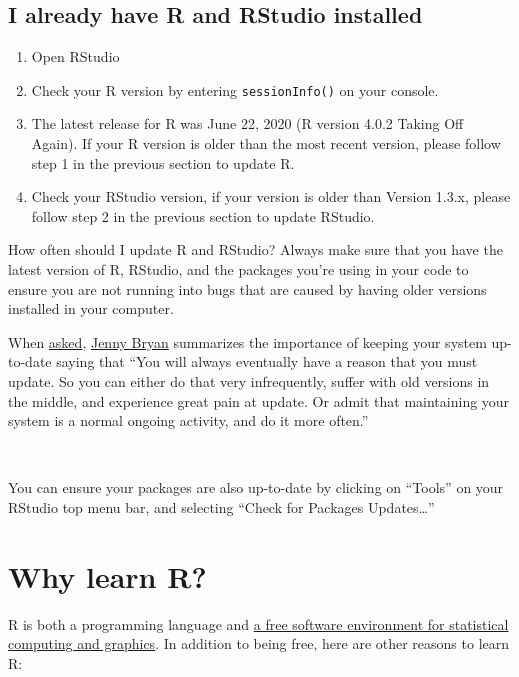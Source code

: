 \documentclass[
]{book}
\providecommand{\tightlist}{%
  \setlength{\itemsep}{0pt}\setlength{\parskip}{0pt}}
\begin{document}
\hypertarget{i-already-have-r-and-rstudio-installed}{%
\subsection{I already have R and RStudio installed}\label{i-already-have-r-and-rstudio-installed}}

\begin{enumerate}
\def\labelenumi{\arabic{enumi}.}
\tightlist
\item
  Open RStudio
\item
  Check your R version by entering \texttt{sessionInfo()} on your console.
\item
  The latest release for R was June 22, 2020 (R version 4.0.2 Taking Off Again). If your R version is older than the most recent version, please follow step 1 in the previous section to update R.
\item
  Check your RStudio version, if your version is older than Version 1.3.x, please follow step 2 in the previous section to update RStudio.
\end{enumerate}

How often should I update R and RStudio? Always make sure that you have the latest version of R, RStudio, and the packages you're using in your code to ensure you are not running into bugs that are caused by having older versions installed in your computer.

When \href{https://community.rstudio.com/t/should-i-update-all-my-r-packages-frequently-yes-no-why/5856/4}{asked}, \href{https://community.rstudio.com/u/jennybryan}{Jenny Bryan} summarizes the importance of keeping your system up-to-date saying that ``You will always eventually have a reason that you must update. So you can either do that very infrequently, suffer with old versions in the middle, and experience great pain at update. Or admit that maintaining your system is a normal ongoing activity, and do it more often.''

~

You can ensure your packages are also up-to-date by clicking on ``Tools'' on your RStudio top menu bar, and selecting ``Check for Packages Updates\ldots{}''

\hypertarget{why-learn-r}{%
\section{Why learn R?}\label{why-learn-r}}

R is both a programming language and \href{https://www.r-project.org/}{a free software environment for statistical computing and graphics}. In addition to being free, here are other reasons to learn R:
\end{document}
